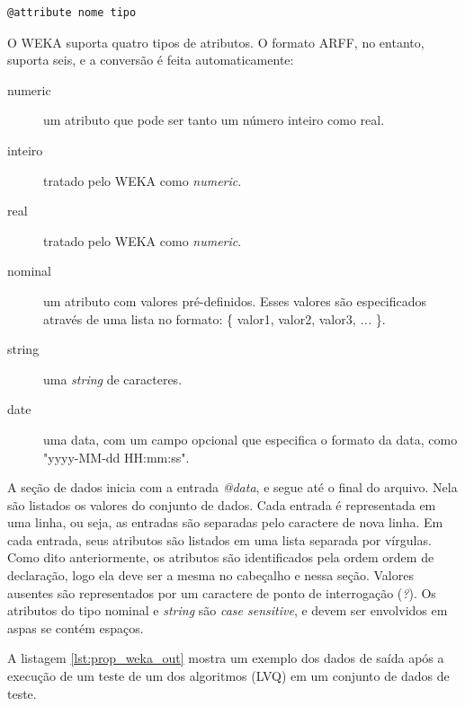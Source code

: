\begin{lstlisting}[caption=Formato de uma entrada \emph{@attribute}, label=lst:prop_attribute_out]
@attribute nome tipo
\end{lstlisting}

O WEKA suporta quatro tipos de atributos. O formato ARFF, no entanto, suporta seis, e a conversão é feita automaticamente:

\begin{description}
    \item[numeric] um atributo que pode ser tanto um número inteiro como real.
    \item[inteiro] tratado pelo WEKA como \emph{numeric}.
    \item[real] tratado pelo WEKA como \emph{numeric}.
    \item[nominal] um atributo com valores pré-definidos. Esses valores são especificados através de uma lista no formato: \{ valor1, valor2, valor3, \emph{...} \}.
    \item[string] uma \emph{string} de caracteres.
    \item[date] uma data, com um campo opcional que especifica o formato da data, como "yyyy-MM-dd HH:mm:ss".
\end{description}

A seção de dados inicia com a entrada \emph{@data}, e segue até o final do arquivo. Nela são listados os valores do conjunto de dados. Cada entrada é representada em uma linha, ou seja, as entradas são separadas pelo caractere de nova linha. Em cada entrada, seus atributos são listados em uma lista separada por vírgulas. Como dito anteriormente, os atributos são identificados pela ordem ordem de declaração, logo ela deve ser a mesma no cabeçalho e nessa seção. Valores ausentes são representados por um caractere de ponto de interrogação (\emph{?}). Os atributos do tipo nominal e \emph{string} são \emph{case sensitive}, e devem ser envolvidos em aspas se contém espaços.

A listagem \ref{lst:prop_weka_out} mostra um exemplo dos dados de saída após a execução de um teste de um dos algoritmos (LVQ) em um conjunto de dados de teste.

